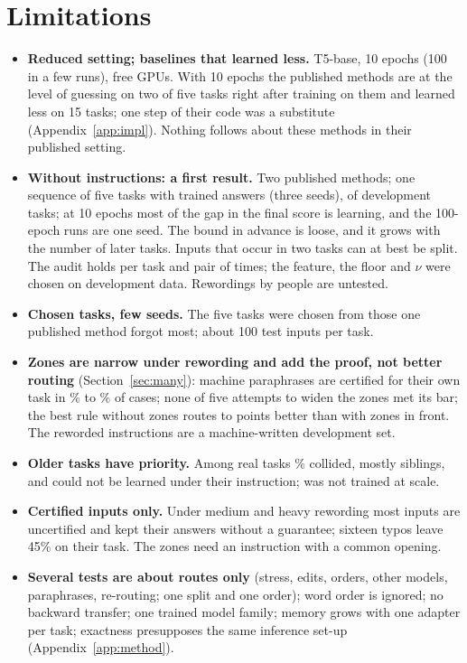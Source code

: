 \section{Limitations}
\label{sec:limits}

\begin{itemize}
  \item \textbf{Reduced setting; baselines that learned less.} T5-base, 10 epochs (100 in a few runs), free GPUs. With 10 epochs the
  published methods are at the level of guessing on two of five tasks right after training on them and
  learned less on 15 tasks; one step of their code was a substitute (Appendix~\ref{app:impl}). Nothing
  follows about these methods in their published setting.
  \item \textbf{Without instructions: a first result.} Two published methods; one sequence of five
  tasks with trained answers (three seeds), of development tasks; at 10 epochs most of the gap in the final score is
  learning, and the 100-epoch runs are one seed. The bound in advance is loose, and it grows with the number of later tasks. Inputs that occur
  in two tasks can at best be split. The audit holds per task and pair of times; the feature, the
  floor and $\nu$ were chosen on development data. Rewordings by people are untested.
  \item \textbf{Chosen tasks, few seeds.} The five tasks were chosen from those one published method
  forgot most; about 100 test inputs per task.
  \item \textbf{Zones are narrow under rewording and add the proof, not better routing}
  (Section~\ref{sec:many}): machine paraphrases are certified for their own task in
  \WidenRefTfivePLow{}\% to \WidenRefTfivePHigh{}\% of cases; none of five attempts to widen the zones met
  its bar; the best rule without zones routes \RerouteZonesCost{} to \RerouteZonesCostEs{} points better than with zones in front. The reworded instructions are a
  machine-written development set.
  \item \textbf{Older tasks have priority.} Among \ManyTasks{} real tasks \ManyCollidingPct{}\%
  collided, mostly siblings, and \ManyAllHeld{} could not be learned under their instruction;
  \exactfirst{} was not trained at scale.
  \item \textbf{Certified inputs only.} Under medium and heavy rewording most inputs are uncertified and
  kept their answers without a guarantee; sixteen typos leave 45\% on their task.
  The zones need an instruction with a common opening.
  \item \textbf{Several tests are about routes only} (stress, edits, orders, other models, paraphrases,
  re-routing; one split and one order); word order is ignored; no backward transfer; one trained model
  family; memory grows with one adapter per task; exactness presupposes the same inference set-up
  (Appendix~\ref{app:method}).
\end{itemize}

